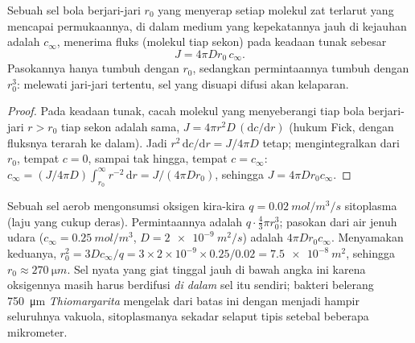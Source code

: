 \begin{theorem}\label{thm:b2:unicellular-diversity:supply}
Sebuah sel bola berjari-jari $r_0$ yang menyerap setiap molekul zat
terlarut yang mencapai permukaannya, di dalam medium yang
kepekatannya jauh di kejauhan adalah $c_\infty$, menerima fluks (molekul
tiap sekon) pada keadaan tunak sebesar
\[
J = 4\pi D r_0\, c_\infty .
\]
Pasokannya hanya tumbuh dengan $r_0$, sedangkan permintaannya tumbuh
dengan $r_0^3$: melewati jari-jari tertentu, sel yang disuapi difusi
akan kelaparan.
\end{theorem}
\begin{proof}
Pada keadaan tunak, cacah molekul yang menyeberangi tiap bola
berjari-jari $r > r_0$ tiap sekon adalah sama, $J = 4\pi r^2 D\,
(\mathrm{d}c/\mathrm{d}r)$ (hukum Fick, dengan fluksnya terarah ke
dalam). Jadi $r^2\,\mathrm{d}c/\mathrm{d}r = J/4\pi D$ tetap;
mengintegralkan dari $r_0$, tempat $c = 0$, sampai tak hingga, tempat
$c = c_\infty$: $c_\infty = (J/4\pi D)\int_{r_0}^{\infty} r^{-2}\,\mathrm{d}r =
J/(4\pi D r_0)$, sehingga $J = 4\pi D r_0 c_\infty$.
\end{proof}

\begin{example}\label{ex:b2:unicellular-diversity:howbig}
Sebuah sel aerob mengonsumsi oksigen kira-kira $q = \qty{0.02}{mol/m^3/s}$
sitoplasma (laju yang cukup deras). Permintaannya adalah $q \cdot \tfrac{4}{3}\pi
r_0^3$; pasokan dari air jenuh udara ($c_\infty =
\qty{0.25}{mol/m^3}$, $D = \qty{2e-9}{m^2/s}$) adalah $4\pi D r_0
c_\infty$. Menyamakan keduanya, $r_0^2 = 3Dc_\infty/q = 3\times 2\times 10^{-9}
\times 0.25/0.02 = \qty{7.5e-8}{m^2}$, sehingga $r_0 \approx
\qty{270}{\micro m}$. Sel nyata yang giat tinggal jauh di bawah angka ini
karena oksigennya masih harus berdifusi \emph{di dalam} sel itu sendiri;
bakteri belerang \qty{750}{\micro m} \emph{Thiomargarita} mengelak dari
batas ini dengan menjadi hampir seluruhnya vakuola, sitoplasmanya
sekadar selaput tipis setebal beberapa mikrometer.
\end{example}

